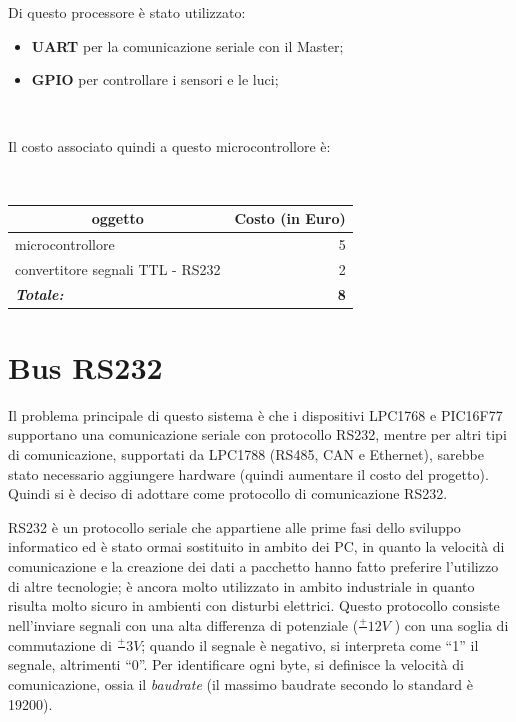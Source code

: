 \documentclass[a4paper,titlepage]{book}
\newcommand{\itema}{\begin{itemize}[noitemsep,topsep=10pt,parsep=23pt,partopsep=0pt]}
\begin{document}
Di questo processore è stato utilizzato:

\itema

\item \textbf{UART} per la comunicazione seriale con il Master;
\item \textbf{GPIO} per controllare i sensori e le luci;
\end{itemize}
 
~

Il costo associato quindi a questo microcontrollore è:

~

\begin{tabular}{|l  r|}
\hline
\multicolumn{1}{|c|}{\textbf {oggetto}} & \multicolumn{1}{c|}{\textbf {Costo (in Euro)}} \\
\hline

microcontrollore			& 5 \\
convertitore segnali TTL - RS232 	& 2  \\
\hline
\hline

\textit{\textbf{Totale:}}		& \textbf{8} \\

\hline
\end{tabular}

\section{Bus RS232}



Il problema principale di questo sistema è che i dispositivi LPC1768 e PIC16F77 supportano una comunicazione seriale con protocollo RS232, mentre per altri tipi di comunicazione, supportati da LPC1788 (RS485, CAN e Ethernet), sarebbe stato necessario aggiungere hardware (quindi aumentare il costo del progetto). Quindi si è deciso di adottare come protocollo di comunicazione RS232.

RS232 è un protocollo seriale che appartiene alle prime fasi dello sviluppo informatico ed è stato ormai sostituito in ambito dei PC, in quanto la velocità di comunicazione e la creazione dei dati a pacchetto hanno fatto preferire l'utilizzo di altre tecnologie; è ancora molto utilizzato in ambito industriale in quanto risulta molto sicuro in ambienti con disturbi elettrici. Questo protocollo consiste nell'inviare segnali con una alta differenza di potenziale ($ \frac{+}{}12V $ ) con una soglia di commutazione di $\frac{+}{} 3V $; quando il segnale è negativo, si interpreta come ``1'' il segnale, altrimenti ``0''. Per identificare ogni byte, si definisce la velocità di comunicazione, ossia il \textit{baudrate} (il massimo baudrate secondo lo standard è 19200).
\end{document}

